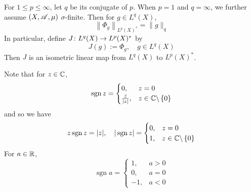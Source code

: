 \begin{prop}
	For $1 \leq p \leq \infty$, let $q$ be its conjugate of $p$. When $p=1$ and $q = \infty$, we further assume $(X,\mathscr{A},\mu)$ $\sigma$-finite. Then for $g \in L^q(X)$, 
	\begin{equation*}
		\left\|\Phi_g\right\|_{L^p(X)^*} =\|g\|_{q}
	\end{equation*}
	In particular, define $J \colon L^q(X) \rightarrow L^p(X)^*$ by
	\begin{equation*}
		J(g):=\Phi_g,\quad g \in L^q(X)
	\end{equation*}
	Then $J$ is an isometric linear map from $L^q(X)$ to $L^p(X)^*$.
\end{prop}
\noindent Note that for $z \in \mathbb{C}$,
\begin{equation*}
	\operatorname{sgn} z= \begin{cases}0, & z=0 \\ \frac{\bar{z}}{|z|}, & z \in \mathbb{C} \backslash \left\{0\right\}\end{cases}
\end{equation*}
and so we have
\begin{equation*}
	z \operatorname{sgn} z=|z|, \quad|\operatorname{sgn} z|= \begin{cases}0, & z=0 \\ 1, & z \in \mathbb{C}\backslash \left\{0\right\}\end{cases}
\end{equation*}
For $a \in \mathbb{R}$,
\begin{equation*}
	\operatorname{sgn} a= \begin{cases}1, & a>0 \\ 0, & a=0 \\ -1, & a<0\end{cases}
\end{equation*}
